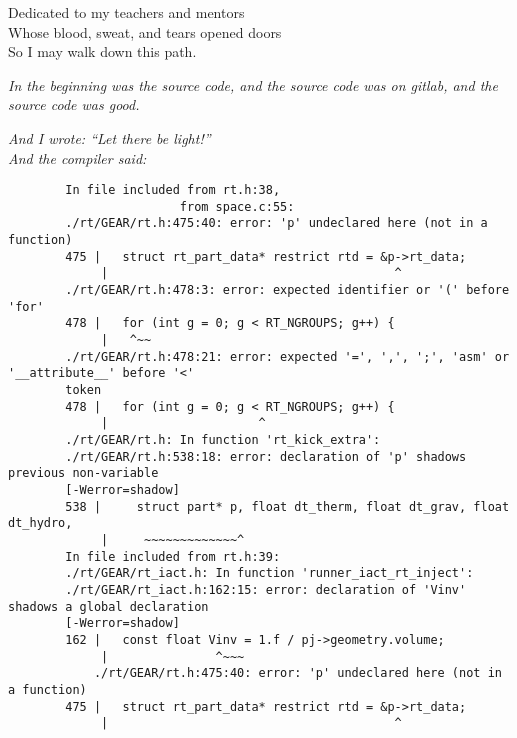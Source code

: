 \cleardoublepage

\thispagestyle{empty}
\vspace*{7cm}


\begin{center}
    Dedicated to my teachers and mentors\\
    Whose blood, sweat, and tears opened doors\\
    So I may walk down this path.
\end{center}

\cleardoublepage

\thispagestyle{empty}

\textit{ 
In the beginning was the source code, and the source code was on gitlab, and the source code was 
good.}

\textit{
And I wrote: ``Let there be light!''
} \\


\textit{And the compiler said:}

\begin{lstlisting}
        In file included from rt.h:38,
                        from space.c:55:
        ./rt/GEAR/rt.h:475:40: error: 'p' undeclared here (not in a function)
        475 |   struct rt_part_data* restrict rtd = &p->rt_data;
             |                                        ^
        ./rt/GEAR/rt.h:478:3: error: expected identifier or '(' before 'for'
        478 |   for (int g = 0; g < RT_NGROUPS; g++) {
             |   ^~~
        ./rt/GEAR/rt.h:478:21: error: expected '=', ',', ';', 'asm' or '__attribute__' before '<' 
        token
        478 |   for (int g = 0; g < RT_NGROUPS; g++) {
             |                     ^
        ./rt/GEAR/rt.h: In function 'rt_kick_extra':
        ./rt/GEAR/rt.h:538:18: error: declaration of 'p' shadows previous non-variable 
        [-Werror=shadow]
        538 |     struct part* p, float dt_therm, float dt_grav, float dt_hydro,
             |     ~~~~~~~~~~~~~^
        In file included from rt.h:39:
        ./rt/GEAR/rt_iact.h: In function 'runner_iact_rt_inject':
        ./rt/GEAR/rt_iact.h:162:15: error: declaration of 'Vinv' shadows a global declaration 
        [-Werror=shadow]
        162 |   const float Vinv = 1.f / pj->geometry.volume;
             |               ^~~~
            ./rt/GEAR/rt.h:475:40: error: 'p' undeclared here (not in a function)
        475 |   struct rt_part_data* restrict rtd = &p->rt_data;
             |                                        ^
\end{lstlisting}




